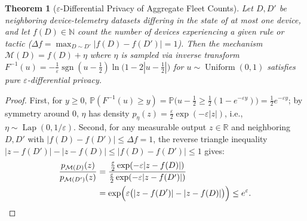 \documentclass[10pt,twocolumn,letterpaper]{article}
\makeatletter
\theoremstyle{plain}
\newtheorem{theorem}{Theorem}[section]
\theoremstyle{definition}
\theoremstyle{remark}
\DeclareRobustCommand{\_}{\ifmmode\nfss@text{\textunderscore}\else\textunderscore\penalty\@highpenalty\hskip\z@skip\fi}
\makeatother
\begin{document}
\begin{theorem}[$\varepsilon$-Differential Privacy of Aggregate Fleet Counts]
Let $D, D'$ be neighboring device-telemetry datasets differing in the state of at most one device, and let $f(D) \in \mathbb{N}$ count the number of devices experiencing a given rule or tactic ($\Delta f = \max_{D \sim D'} |f(D) - f(D')| = 1$). Then the mechanism $\mathcal{M}(D) = f(D) + \eta$ where $\eta$ is sampled via inverse transform $F^{-1}(u) = -\frac{1}{\varepsilon}\operatorname{sgn}(u - \tfrac{1}{2})\ln\big(1 - 2|u - \tfrac{1}{2}|\big)$ for $u \sim \operatorname{Uniform}(0, 1)$ satisfies pure $\varepsilon$-differential privacy.
\end{theorem}
\begin{proof}
First, for $y \ge 0$, $\mathbb{P}(F^{-1}(u) \ge y) = \mathbb{P}\big(u - \tfrac{1}{2} \ge \tfrac{1}{2}(1 - e^{-\varepsilon y})\big) = \frac{1}{2}e^{-\varepsilon y}$; by symmetry around $0$, $\eta$ has density $p_\eta(z) = \frac{\varepsilon}{2}\exp(-\varepsilon |z|)$, i.e., $\eta \sim \operatorname{Lap}(0, 1/\varepsilon)$. Second, for any measurable output $z \in \mathbb{R}$ and neighboring $D, D'$ with $|f(D) - f(D')| \le \Delta f = 1$, the reverse triangle inequality $|z - f(D')| - |z - f(D)| \le |f(D) - f(D')| \le 1$ gives:
\begin{align*}
  \frac{p_{\mathcal{M}(D)}(z)}{p_{\mathcal{M}(D')}(z)}
  &= \frac{\frac{\varepsilon}{2}\exp(-\varepsilon |z - f(D)|)}{\frac{\varepsilon}{2}\exp(-\varepsilon |z - f(D')|)}\\
  &= \exp\!\Big(\varepsilon\big(|z - f(D')| - |z - f(D)|\big)\Big) \le e^{\varepsilon}. \qedhere
\end{align*}
\end{proof}
\end{document}
